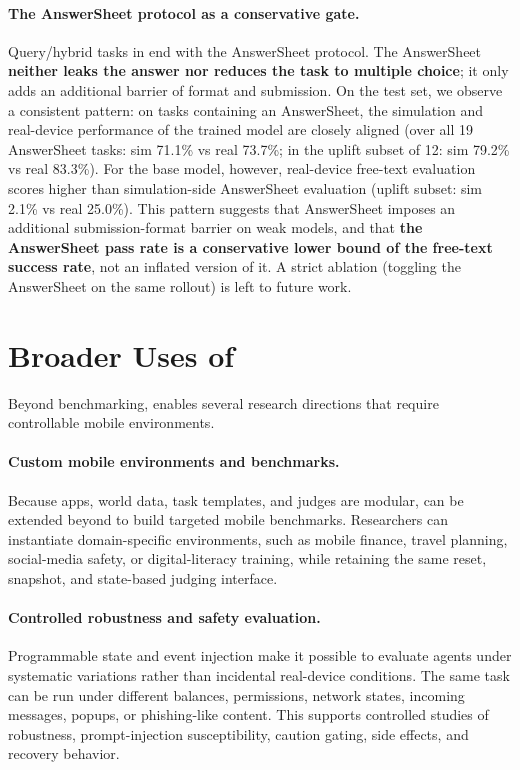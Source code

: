 \paragraph{The AnswerSheet protocol as a conservative gate.} Query/hybrid tasks in \sys{} end with the AnswerSheet protocol. The AnswerSheet \textbf{neither leaks the answer nor reduces the task to multiple choice}; it only adds an additional barrier of format and submission. On the test set, we observe a consistent pattern: on tasks containing an AnswerSheet, the simulation and real-device performance of the trained model are closely aligned (over all 19 AnswerSheet tasks: sim 71.1\% vs real 73.7\%; in the uplift subset of 12: sim 79.2\% vs real 83.3\%). For the base model, however, real-device free-text evaluation scores higher than simulation-side AnswerSheet evaluation (uplift subset: sim 2.1\% vs real 25.0\%). This pattern suggests that AnswerSheet imposes an additional submission-format barrier on weak models, and that \textbf{the AnswerSheet pass rate is a conservative lower bound of the free-text success rate}, not an inflated version of it. A strict ablation (toggling the AnswerSheet on the same rollout) is left to future work.


\section{Broader Uses of \sys{}}\label{app:broader-uses}

Beyond benchmarking, \sys{} enables several research directions that require controllable mobile environments.

\paragraph{Custom mobile environments and benchmarks.} Because apps, world data, task templates, and judges are modular, \sys{} can be extended beyond \bench{} to build targeted mobile benchmarks. Researchers can instantiate domain-specific environments, such as mobile finance, travel planning, social-media safety, or digital-literacy training, while retaining the same reset, snapshot, and state-based judging interface.

\paragraph{Controlled robustness and safety evaluation.} Programmable state and event injection make it possible to evaluate agents under systematic variations rather than incidental real-device conditions. The same task can be run under different balances, permissions, network states, incoming messages, popups, or phishing-like content. This supports controlled studies of robustness, prompt-injection susceptibility, caution gating, side effects, and recovery behavior.

